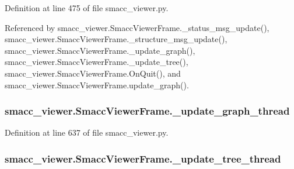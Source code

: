 Definition at line 475 of file smacc\+\_\+viewer.\+py.



Referenced by smacc\+\_\+viewer.\+Smacc\+Viewer\+Frame.\+\_\+status\+\_\+msg\+\_\+update(), smacc\+\_\+viewer.\+Smacc\+Viewer\+Frame.\+\_\+structure\+\_\+msg\+\_\+update(), smacc\+\_\+viewer.\+Smacc\+Viewer\+Frame.\+\_\+update\+\_\+graph(), smacc\+\_\+viewer.\+Smacc\+Viewer\+Frame.\+\_\+update\+\_\+tree(), smacc\+\_\+viewer.\+Smacc\+Viewer\+Frame.\+On\+Quit(), and smacc\+\_\+viewer.\+Smacc\+Viewer\+Frame.\+update\+\_\+graph().

\subsubsection[{\texorpdfstring{\+\_\+update\+\_\+graph\+\_\+thread}{_update_graph_thread}}]{\setlength{\rightskip}{0pt plus 5cm}smacc\+\_\+viewer.\+Smacc\+Viewer\+Frame.\+\_\+update\+\_\+graph\+\_\+thread\hspace{0.3cm}{\ttfamily [private]}}\hypertarget{classsmacc__viewer_1_1SmaccViewerFrame_a361b777202fa9932dee7ffeeb75fe781}{}\label{classsmacc__viewer_1_1SmaccViewerFrame_a361b777202fa9932dee7ffeeb75fe781}


Definition at line 637 of file smacc\+\_\+viewer.\+py.

\subsubsection[{\texorpdfstring{\+\_\+update\+\_\+tree\+\_\+thread}{_update_tree_thread}}]{\setlength{\rightskip}{0pt plus 5cm}smacc\+\_\+viewer.\+Smacc\+Viewer\+Frame.\+\_\+update\+\_\+tree\+\_\+thread\hspace{0.3cm}{\ttfamily [private]}}\hypertarget{classsmacc__viewer_1_1SmaccViewerFrame_a269b1a73d0826a7052d129261e18a2e3}{}\label{classsmacc__viewer_1_1SmaccViewerFrame_a269b1a73d0826a7052d129261e18a2e3}


